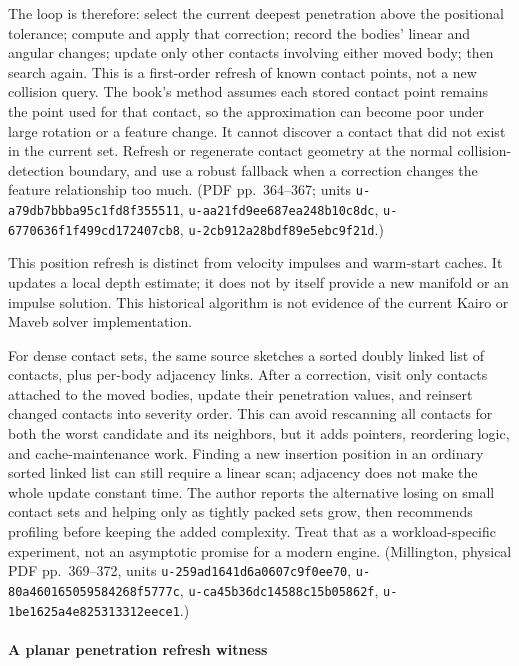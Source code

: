 The loop is therefore: select the current deepest penetration above the positional tolerance; compute and apply that correction; record the bodies' linear and angular changes; update only other contacts involving either moved body; then search again. This is a first-order refresh of known contact points, not a new collision query. The book's method assumes each stored contact point remains the point used for that contact, so the approximation can become poor under large rotation or a feature change. It cannot discover a contact that did not exist in the current set. Refresh or regenerate contact geometry at the normal collision-detection boundary, and use a robust fallback when a correction changes the feature relationship too much. (PDF pp.~364--367; units \texttt{u-a79db7bbba95c1fd8f355511}, \texttt{u-aa21fd9ee687ea248b10c8dc}, \texttt{u-6770636f1f499cd172407cb8}, \texttt{u-2cb912a28bdf89e5ebc9f21d}.)

This position refresh is distinct from velocity impulses and warm-start caches. It updates a local depth estimate; it does not by itself provide a new manifold or an impulse solution. This historical algorithm is not evidence of the current Kairo or Maveb solver implementation.

For dense contact sets, the same source sketches a sorted doubly linked list of contacts, plus per-body adjacency links. After a correction, visit only contacts attached to the moved bodies, update their penetration values, and reinsert changed contacts into severity order. This can avoid rescanning all contacts for both the worst candidate and its neighbors, but it adds pointers, reordering logic, and cache-maintenance work. Finding a new insertion position in an ordinary sorted linked list can still require a linear scan; adjacency does not make the whole update constant time. The author reports the alternative losing on small contact sets and helping only as tightly packed sets grow, then recommends profiling before keeping the added complexity. Treat that as a workload-specific experiment, not an asymptotic promise for a modern engine. (Millington, physical PDF pp.~369--372, units \texttt{u-259ad1641d6a0607c9f0ee70}, \texttt{u-80a460165059584268f5777c}, \texttt{u-ca45b36dc14588c15b05862f}, \texttt{u-1be1625a4e825313312eece1}.)

\paragraph{A planar penetration refresh witness}\label{06-engine-ii-ch046-a-planar-penetration-refresh-witness}

